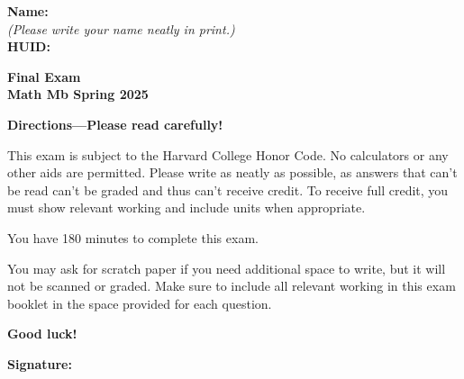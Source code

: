 \documentclass{article}
\begin{document}
{\large \mbox{} \hfill \bf Name:\underline{\hspace{3in}}}\\[2pt]
{\mbox{} \hfill \it (Please write your name neatly in print.)}\\[12pt]
{\large \mbox{} \hfill \bf HUID:\underline{\hspace{3in}}}
 
\medskip
 
\noindent
{\large\bf
Final Exam\\
Math Mb Spring 2025}
\noindent


{\Large
\begin{center}\textbf{Directions---Please read carefully!} \end{center}}


This exam is subject to the Harvard College Honor Code. No calculators or any other aids are permitted.  Please write as neatly as possible, as answers that can't be read can't be graded and thus can't receive credit. To receive full credit, you must show relevant working
and include units when appropriate. 

You have 180 minutes to complete this exam. 

You may ask for scratch paper if you need additional space to write, but it will not be scanned or graded. Make sure to include all relevant working in this exam booklet in the space provided for each question.

\begin{center}\textbf{Good luck!}\end{center}


\vfill

\vspace{0.3in}

{\large \mbox{} \hfill \bf Signature:\underline{\hspace{3in}}}
\thispagestyle{empty}

\newpage
\end{document}
